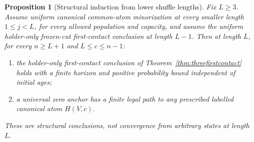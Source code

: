 \documentclass[11pt]{article}
\newtheorem{proposition}[theorem]{Proposition}
\begin{document}
\begin{proposition}[Structural induction from lower shuffle lengths]
\label{prop:shuffleinductionstructure}
Fix $L\ge3$. Assume uniform canonical common-atom minorization
at every smaller length $1\le j<L$, for every allowed population
and capacity, and assume the uniform holder-only frozen-cut
first-contact conclusion at length $L-1$. Then at length $L$,
for every $n\ge L+1$ and $L\le c\le n-1$:
\begin{enumerate}
\item the holder-only first-contact conclusion of
Theorem~\ref{thm:threefirstcontact} holds with a finite horizon
and positive probability bound independent of initial ages;
\item a universal zero anchor has a finite legal path to any
prescribed labelled canonical atom $H(V,c)$.
\end{enumerate}
These are structural conclusions, not convergence from arbitrary
states at length $L$.
\end{proposition}
\end{document}
